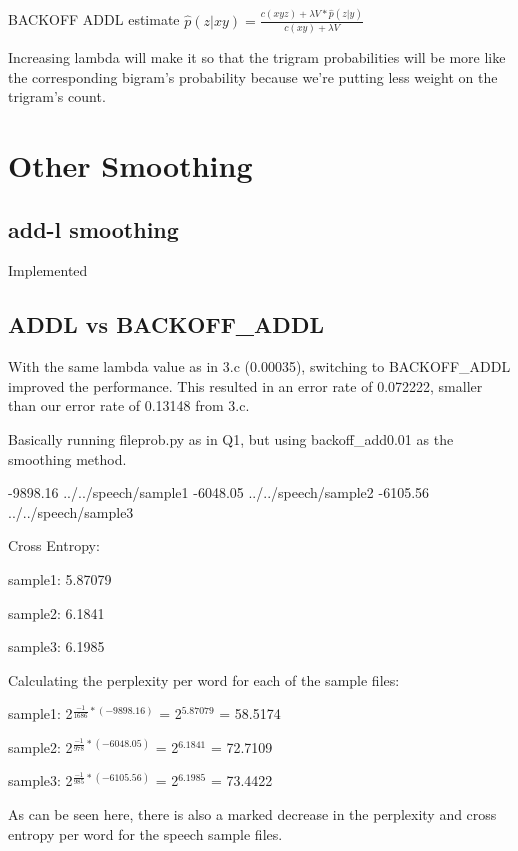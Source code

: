 \documentclass[12pt, letterpaper]{article}
\begin{document}
\subsection{}

BACKOFF ADDL estimate $\hat{p}(z | xy) = \frac{c(xyz) + \lambda V * \hat{p}(z|y)}{c(xy) + \lambda V}$

Increasing lambda will make it so that the trigram probabilities will be more like the corresponding bigram's probability because we're putting less weight on the trigram's count.

\section{Other Smoothing}
\subsection{add-l smoothing}
Implemented

\subsection{ADDL vs BACKOFF\_ADDL}

With the same lambda value as in 3.c (0.00035), switching to BACKOFF\_ADDL improved the performance. This resulted in an error rate of 0.072222, smaller than our error rate of 0.13148 from 3.c.


Basically running fileprob.py as in Q1, but using backoff\_add0.01 as the smoothing method.

-9898.16	../../speech/sample1
-6048.05	../../speech/sample2
-6105.56	../../speech/sample3

Cross Entropy: 

sample1: 5.87079

sample2: 6.1841

sample3: 6.1985

Calculating the perplexity per word for each of the sample files:

sample1: 2$^{\frac{-1}{1686} * (-9898.16)}$ = 2$^{5.87079}$ = 58.5174

sample2: 2$^{\frac{-1}{978} * (-6048.05)}$ = 2$^{6.1841}$ = 72.7109

sample3: 2$^{\frac{-1}{985} * (-6105.56)}$ = 2$^{6.1985}$ = 73.4422

As can be seen here, there is also a marked decrease in the perplexity and cross entropy per word for the speech sample files. 
\end{document}
